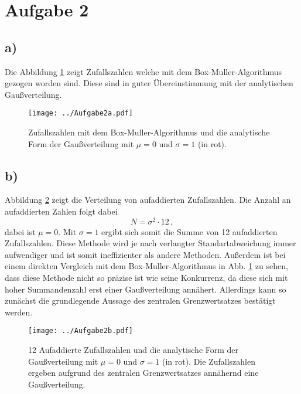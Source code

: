\section*{Aufgabe 2}
\label{sec:Aufgabe2}
\subsection*{a)}
Die Abbildung \ref{2a} zeigt Zufallszahlen welche mit dem Box-Muller-Algorithmus gezogen worden sind.
Diese sind in guter Übereinstimmung mit der analytischen Gaußverteilung.

\begin{figure}
	\centering
	\texttt{[image: ../Aufgabe2a.pdf]}
	\caption{Zufallszahlen mit dem Box-Muller-Algorithmus und die analytische Form der Gaußverteilung mit $\mu = 0$ und $\sigma = 1$ (in rot).}
	\label{2a}
\end{figure}

\subsection*{b)}
Abbildung \ref{2b} zeigt die Verteilung von aufaddierten Zufallszahlen.
Die Anzahl an aufaddierten Zahlen folgt dabei
\begin{equation*}
	N = \sigma^2 \cdot 12 \,,
\end{equation*}
dabei ist $\mu = 0$.
Mit $\sigma = 1$ ergibt sich somit die Summe von 12 aufaddierten Zufallszahlen.
Diese Methode wird je nach verlangter Standartabweichung immer aufwendiger und ist somit ineffizienter als andere Methoden.
Außerdem ist bei einem direkten Vergleich mit dem Box-Muller-Algorithmus in Abb. \ref{2a} zu sehen, dass diese Methode nicht so präzise ist wie seine Konkurrenz, da diese sich mit hoher Summandenzahl erst einer Gaußverteilung annähert.
Allerdings kann so zunächst die grundlegende Aussage des zentralen Grenzwertsatzes bestätigt werden.

\begin{figure}
	\centering
	\texttt{[image: ../Aufgabe2b.pdf]}
	\caption{12 Aufaddierte Zufallszahlen und die analytische Form der Gaußverteilung mit $\mu = 0$ und $\sigma = 1$ (in rot).
	Die Zufallszahlen ergeben aufgrund des zentralen Grenzwertsatzes annähernd eine Gaußverteilung.}
	\label{2b}
\end{figure}

\FloatBarrier
